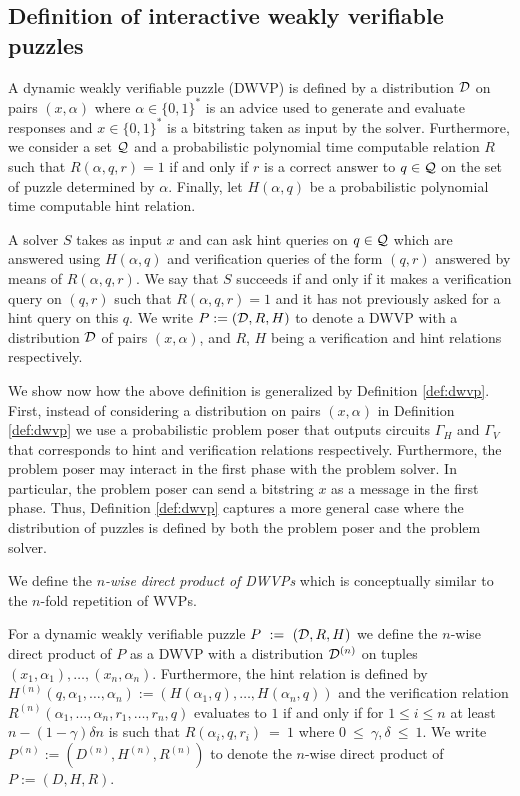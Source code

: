 \subsection{Definition of interactive weakly verifiable puzzles}
\begin{definition}
  \label{def:dwvp_dodis}
  A \textnormal{dynamic weakly verifiable puzzle} (DWVP) is defined by a distribution $\mathcal{D}$ on pairs $(x, \alpha)$
  where $\alpha \in \{0,1\}^{*}$ is an advice used to generate and evaluate responses and $x \in \{0,1\}^{*}$ is
  a bitstring taken as input by the solver.
  Furthermore, we consider a set $\mathcal{Q}$ and a probabilistic polynomial time computable relation $R$ such that
  $R(\alpha, q, r) = 1$ if and only if $r$ is a correct answer to $q \in \mathcal{Q}$ on the set of puzzle determined by $\alpha$.
  Finally, let $H(\alpha, q)$ be a probabilistic polynomial time computable \textnormal{hint} relation.

  A solver $S$ takes as input $x$ and can ask hint queries on $q \in \mathcal{Q}$ which are answered using $H(\alpha, q)$ and verification
  queries of the form $(q,r)$ answered by means of $R(\alpha, q, r)$.
  We say that $S$ succeeds if and only if it makes a verification query on $(q,r)$ such that
  $R(\alpha,q,r) = 1$ and it
  has not previously asked for a hint query on this $q$. We write $P := (\mathcal{D}, R, H)$ to denote a DWVP with a distribution
  $\mathcal{D}$ of pairs $(x, \alpha)$, and $R$, $H$ being a verification and hint relations respectively.
\end{definition}
%
We show now how the above definition is generalized by Definition \ref{def:dwvp}.
First, instead of considering a distribution on pairs $(x,\alpha)$ in Definition \ref{def:dwvp}
we use a probabilistic problem poser that outputs circuits $\Gamma_H$ and $\Gamma_V$ that corresponds to hint
and verification relations respectively.
Furthermore, the problem poser may interact in the first phase with the problem solver.
In particular, the problem poser can send a bitstring $x$ as a message in the first phase.
Thus, Definition \ref{def:dwvp} captures a more general case where the distribution of
puzzles is defined by both the problem poser and the problem solver.

We define the \textit{$n$-wise direct product of DWVPs} which is conceptually similar to the $n$-fold repetition of WVPs.
%
\begin{definition}
For a dynamic weakly verifiable puzzle $P~:=~(\mathcal{D}, R, H)$ we define the $n$-wise direct product of $P$
as a DWVP with a distribution $\mathcal{D}^{(n)}$ on tuples $(x_1, \alpha_1), \dotsc, (x_n, \alpha_n)$.
Furthermore, the hint relation is defined by $H^{(n)}(q, \alpha_1, \dotsc, \alpha_n) := (H(\alpha_1, q), \dotsc, H(\alpha_n, q))$ and
the verification relation $R^{(n)}(\alpha_1, \dotsc, \alpha_n, r_1, \dotsc, r_n, q)$ evaluates to $1$ if and only if
for $1\!\leq\!i\!\leq\!n$ at least $n - (1 - \gamma)\delta n$ is such that $R(\alpha_i, q, r_i)~=~1$ where $0~\leq~\gamma,\delta~\leq~1$.
%
We write $P^{(n)} := (D^{(n)}, H^{(n)}, R^{(n)})$ to denote the $n$-wise direct product of $P := (D,H,R)$.
%
\end{definition}

